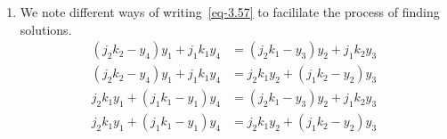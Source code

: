 \documentclass[a4paper,12pt]{article}
\theoremstyle{definition}
\theoremstyle{underlinethm}
\theoremstyle{definition}
\begin{document}
\begin{enumerate}[label =(\alph*)]
\item We note different  ways of writing~\eqref{eq-3.57} to facililate the process of finding solutions.
\begin{align*}
\left(j_{2}k_{2} - y_{4} \right)y_{1} + j_{1}k_{1} y_{4} & =\left(j_{2}k_{1}-y_{3}\right)y_{2} + j_{1}k_{2}y_{3}\tag{3.58}\label{eq-3.58}\\
\left(j_{2}k_{2} - y_{4} \right)y_{1} + j_{1} k_{1} y_{4} &= j_{2}k_{1}y_{2} + \left(j_{1} k_{2} -y_{2} \right)y_{3} \tag{3.59}\label{eq-3.59}\\
j_{2}k_{1}y_{1} + \left(j_{1}k_{1}-y_{1}\right)y_{4} &= \left(j_{2}k_{1} -y_{3}\right)y_{2} + j_{1}k_{2}y_{3}\tag{3.60}\label{eq-3.60}\\
j_{2}k_{1}y_{1} + \left(j_{1}k_{1}-y_{1} \right)y_{4} &= j_{2}k_{1}y_{2} + \left(j_{1}k_{2}-y_{2}\right)y_{3}\tag{3.61}\label{eq-3.61}
\end{align*}
\end{enumerate} 
\end{document}
